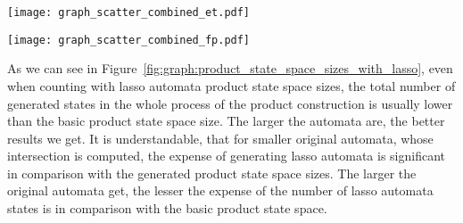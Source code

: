 \begin{figure*}[ht]
    \centering
    \begin{minipage}{0.49\linewidth}
        \centering
        \texttt{[image: graph\_scatter\_combined\_et.pdf]}
        \caption{Emptiness test}
        \label{fig:graph:et_state_space_sizes_comp_with_lasso}
    \end{minipage}
    \hfill
    \begin{minipage}{0.49\linewidth}
        \centering
        \texttt{[image: graph\_scatter\_combined\_fp.pdf]}
        \caption{Full product construction}
        \label{fig:graph:fp_state_space_sizes_comp_with_lasso}
    \end{minipage}
    \vspace{0.5cm}
    \caption{Comparison of state space sizes generated by basic and optimized product construction algorithms with sum of states generated for both the final optimized product and lasso automata states generated in the process of the product construction. Both axes are in logarithmic scale, x-axis showing state space sizes of basic product, y-axis state space sizes of optimized product (and optimized product with lasso automata states). The blue dots represent only the optimized product state space sizes (as in Figure~\ref{fig:graph:product_state_space_sizes}), the orange dots the sum of optimized product state space sizes and the generated lasso states.}
    \label{fig:graph:product_state_space_sizes_with_lasso}
\end{figure*}

As we can see in Figure~\ref{fig:graph:product_state_space_sizes_with_lasso}, even when counting with lasso automata product state space sizes, the total number of generated states in the whole process of the product construction is usually lower than the basic product state space size. The larger the automata are, the better results we get. It is understandable, that for smaller original automata, whose intersection is computed, the expense of generating lasso automata is significant in comparison with the generated product state space sizes. The larger the original automata get, the lesser the expense of the number of lasso automata states is in comparison with the basic product state space.

